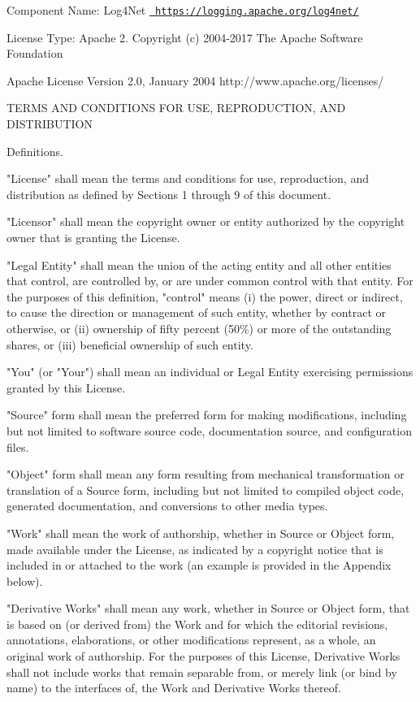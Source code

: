  Component Name\+: Log4\+Net \href{https://logging.apache.org/log4net/}{\texttt{ https\+://logging.\+apache.\+org/log4net/}}

License Type\+: Apache 2. Copyright (c) 2004-\/2017 The Apache Software Foundation \begin{DoxyVerb}                            Apache License
                       Version 2.0, January 2004
                    http://www.apache.org/licenses/
\end{DoxyVerb}
 TERMS AND CONDITIONS FOR USE, REPRODUCTION, AND DISTRIBUTION


\begin{DoxyEnumerate}
\item Definitions.

"{}\+License"{} shall mean the terms and conditions for use, reproduction, and distribution as defined by Sections 1 through 9 of this document.

"{}\+Licensor"{} shall mean the copyright owner or entity authorized by the copyright owner that is granting the License.

"{}\+Legal Entity"{} shall mean the union of the acting entity and all other entities that control, are controlled by, or are under common control with that entity. For the purposes of this definition, "{}control"{} means (i) the power, direct or indirect, to cause the direction or management of such entity, whether by contract or otherwise, or (ii) ownership of fifty percent (50\%) or more of the outstanding shares, or (iii) beneficial ownership of such entity.

"{}\+You"{} (or "{}\+Your"{}) shall mean an individual or Legal Entity exercising permissions granted by this License.

"{}\+Source"{} form shall mean the preferred form for making modifications, including but not limited to software source code, documentation source, and configuration files.

"{}\+Object"{} form shall mean any form resulting from mechanical transformation or translation of a Source form, including but not limited to compiled object code, generated documentation, and conversions to other media types.

"{}\+Work"{} shall mean the work of authorship, whether in Source or Object form, made available under the License, as indicated by a copyright notice that is included in or attached to the work (an example is provided in the Appendix below).

"{}\+Derivative Works"{} shall mean any work, whether in Source or Object form, that is based on (or derived from) the Work and for which the editorial revisions, annotations, elaborations, or other modifications represent, as a whole, an original work of authorship. For the purposes of this License, Derivative Works shall not include works that remain separable from, or merely link (or bind by name) to the interfaces of, the Work and Derivative Works thereof.


\end{DoxyEnumerate}
